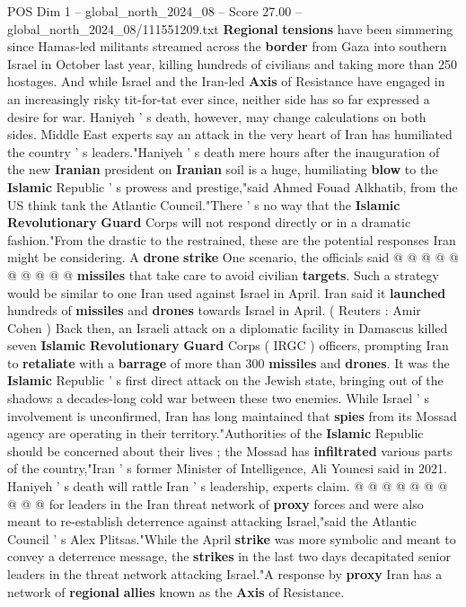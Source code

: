\begin{textsample}{POS Dim 1 – global\_north\_2024\_08 – Score 27.00 – global\_north\_2024\_08/111551209.txt}  \label{ex:f1_pos_080}
\textbf{Regional} \textbf{tensions} have been simmering since Hamas-led militants streamed across the \textbf{border} from Gaza into southern Israel in October last year, killing hundreds of civilians and taking more than 250 hostages.
And while Israel and the Iran-led \textbf{Axis} of Resistance have engaged in an increasingly risky tit-for-tat ever since, neither side has so far expressed a desire for war.
Haniyeh ' s death, however, may change calculations on both sides.
Middle East experts say an attack in the very heart of Iran has humiliated the country ' s leaders."Haniyeh ' s death mere hours after the inauguration of the new \textbf{Iranian} president on \textbf{Iranian} soil is a huge, humiliating \textbf{blow} to the \textbf{Islamic} Republic ' s prowess and prestige,"said Ahmed Fouad Alkhatib, from the US think tank the Atlantic Council."There ' s no way that the \textbf{Islamic} \textbf{Revolutionary} \textbf{Guard} Corps will not respond directly or in a dramatic fashion."From the drastic to the restrained, these are the potential responses Iran might be considering.
A \textbf{drone} \textbf{strike} One scenario, the officials said @ @ @ @ @ @ @ @ @ @ \textbf{missiles} that take care to avoid civilian \textbf{targets}.
Such a strategy would be similar to one Iran used against Israel in April.
Iran said it \textbf{launched} hundreds of \textbf{missiles} and \textbf{drones} towards Israel in April. ( Reuters : Amir Cohen ) Back then, an Israeli attack on a diplomatic facility in Damascus killed seven \textbf{Islamic} \textbf{Revolutionary} \textbf{Guard} Corps ( IRGC ) officers, prompting Iran to \textbf{retaliate} with a \textbf{barrage} of more than 300 \textbf{missiles} and \textbf{drones}.
It was the \textbf{Islamic} Republic ' s first direct attack on the Jewish state, bringing out of the shadows a decades-long cold war between these two enemies.
While Israel ' s involvement is unconfirmed, Iran has long maintained that \textbf{spies} from its Mossad agency are operating in their territory."Authorities of the \textbf{Islamic} Republic should be concerned about their lives ; the Mossad has \textbf{infiltrated} various parts of the country,"Iran ' s former Minister of Intelligence, Ali Younesi said in 2021.
Haniyeh ' s death will rattle Iran ' s leadership, experts claim. @ @ @ @ @ @ @ @ @ @ for leaders in the Iran threat network of \textbf{proxy} forces and were also meant to re-establish deterrence against attacking Israel,"said the Atlantic Council ' s Alex Plitsas."While the April \textbf{strike} was more symbolic and meant to convey a deterrence message, the \textbf{strikes} in the last two days decapitated senior leaders in the threat network attacking Israel."A response by \textbf{proxy} Iran has a network of \textbf{regional} \textbf{allies} known as the \textbf{Axis} of Resistance.

\end{textsample}
